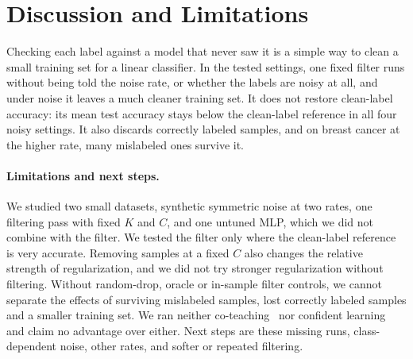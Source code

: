 \section{Discussion and Limitations}\label{sec:discussion}

Checking each label against a model that never saw it is a simple way to clean a small training set for a linear classifier. In the tested settings, one fixed filter runs without being told the noise rate, or whether the labels are noisy at all, and under noise it leaves a much cleaner training set. It does not restore clean-label accuracy: its mean test accuracy stays below the clean-label reference in all four noisy settings. It also discards correctly labeled samples, and on breast cancer at the higher rate, many mislabeled ones survive it.

\paragraph{Limitations and next steps.}
We studied two small datasets, synthetic symmetric noise at two rates, one filtering pass with fixed $K$ and $C$, and one untuned MLP, which we did not combine with the filter. We tested the filter only where the clean-label reference is very accurate. Removing samples at a fixed $C$ also changes the relative strength of regularization, and we did not try stronger regularization without filtering. Without random-drop, oracle or in-sample filter controls, we cannot separate the effects of surviving mislabeled samples, lost correctly labeled samples and a smaller training set. We ran neither co-teaching~\citep{han2018coteaching} nor confident learning~\citep{northcutt2021confident} and claim no advantage over either. Next steps are these missing runs, class-dependent noise, other rates, and softer or repeated filtering.
